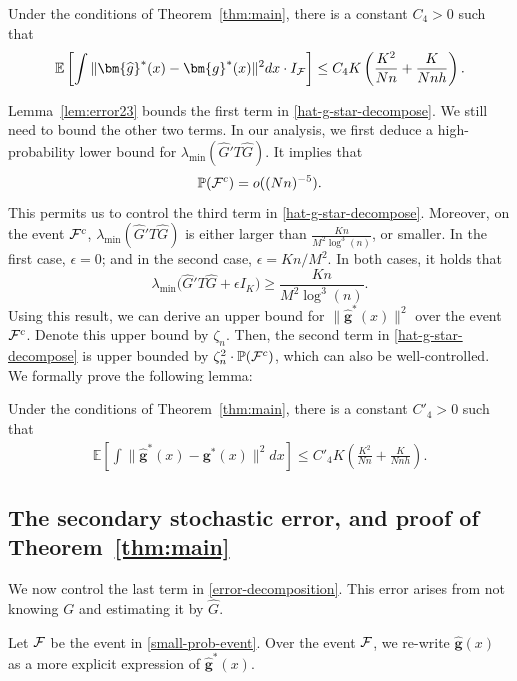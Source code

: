 \documentclass[preprint,11pt]{article}
\newcommand{\mbb}{\mathbb}
\newcommand{\bg}{{\boldsymbol g}}
\numberwithin{equation}{section}
\begin{document}
\begin{lemma}\label{lem:error23}
Under the conditions of Theorem~\ref{thm:main}, there is a constant $C_4>0$ such that
\begin{align*}
    \mbb{E}\left[\int \|\bm{\widehat{g}}^*(x)-\bm{g}^*(x)\|^2dx\cdot I_{\cal F}\right]\le C_4K\left(\frac{K^2}{Nn}+\frac{K}{Nnh}\right).
\end{align*}
\end{lemma}

Lemma~\ref{lem:error23} bounds the first term in \eqref{hat-g-star-decompose}. We still need to bound the other two terms. In our analysis, we first deduce a high-probability lower bound for $\lambda_{\min}(\widehat{G}'T\widehat{G})$. It implies that
\[
\mathbb{P}({\cal F}^c) = o((Nn)^{-5}). 
\] 
This permits us to control the third term in \eqref{hat-g-star-decompose}. 
Moreover, on the event ${\cal F}^c$, $\lambda_{\min}(\widehat{G}'T\widehat{G})$ is either larger than $\frac{Kn}{M^2\log^3(n)}$, or smaller. In the first case, $\epsilon=0$; and in the second case, $\epsilon=Kn/M^2$. In both cases, it holds that
\[
\lambda_{\min}\bigl( \widehat{G}'T\widehat{G} + \epsilon I_K\bigr)\geq \frac{Kn}{M^2\log^3(n)}. 
\]
Using this result, we can derive an upper bound for $\|\widehat{\boldsymbol g}^*(x)\|^2$ over the event ${\cal F}^c$. Denote this upper bound by $\zeta_n$. 
Then, the second term in \eqref{hat-g-star-decompose} is upper bounded by $\zeta_n^2\cdot \mathbb{P}({\cal F}^c)$, which can also be well-controlled. 
We formally prove the following lemma:

\begin{lemma}\label{lem:error2}
Under the conditions of Theorem~\ref{thm:main}, there is a constant $C'_4>0$ such that
\begin{align*}
    \mbb{E}\left[\int \|\bm{\widehat{g}}^*(x)-\bm{g}^*(x)\|^2dx\right]\le C'_4K\left(\frac{K^2}{Nn}+\frac{K}{Nnh}\right).
\end{align*}
\end{lemma}


\subsection{The secondary stochastic error, and proof of Theorem~\ref{thm:main}} \label{subsec:stochastic-error-2}
We now control the last term in \eqref{error-decomposition}. This error arises from not knowing $G$ and estimating it by $\widehat{G}$. 

Let ${\cal F}$ be the event in \eqref{small-prob-event}. 
Over the event ${\cal F}$, we re-write $\widehat{\bg}(x)$ as a more explicit expression of $\widehat{\bg}^*(x)$. %
\end{document}
